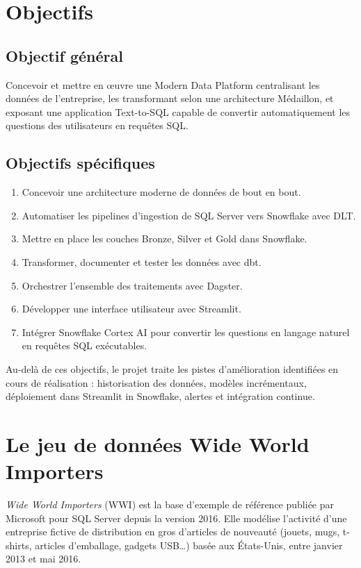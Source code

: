 \section{Objectifs}

\subsection{Objectif général}
Concevoir et mettre en œuvre une Modern Data Platform centralisant les données de l'entreprise, les
transformant selon une architecture Médaillon, et exposant une application Text-to-SQL capable de
convertir automatiquement les questions des utilisateurs en requêtes SQL.

\subsection{Objectifs spécifiques}
\begin{enumerate}
  \item Concevoir une architecture moderne de données de bout en bout.
  \item Automatiser les pipelines d'ingestion de SQL Server vers Snowflake avec DLT.
  \item Mettre en place les couches Bronze, Silver et Gold dans Snowflake.
  \item Transformer, documenter et tester les données avec dbt.
  \item Orchestrer l'ensemble des traitements avec Dagster.
  \item Développer une interface utilisateur avec Streamlit.
  \item Intégrer Snowflake Cortex AI pour convertir les questions en langage naturel en requêtes SQL
        exécutables.
\end{enumerate}

Au-delà de ces objectifs, le projet traite les pistes d'amélioration identifiées en cours de réalisation :
historisation des données, modèles incrémentaux, déploiement dans Streamlit in Snowflake, alertes et
intégration continue.

\section{Le jeu de données Wide World Importers}

\emph{Wide World Importers} (WWI) est la base d'exemple de référence publiée par Microsoft pour SQL
Server depuis la version 2016. Elle modélise l'activité d'une entreprise fictive de distribution en gros
d'articles de nouveauté (jouets, mugs, t-shirts, articles d'emballage, gadgets USB\ldots) basée aux
États-Unis, entre janvier 2013 et mai 2016.

